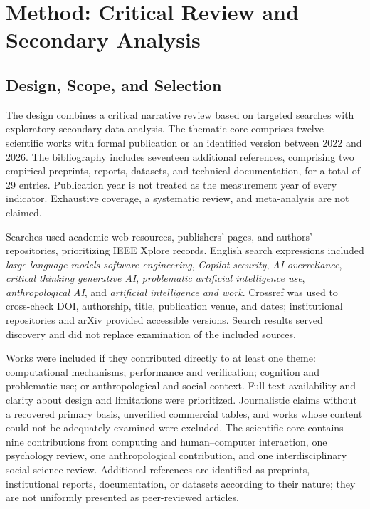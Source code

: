 \documentclass[11pt,a4paper]{article}
\begin{document}
\section{Method: Critical Review and Secondary Analysis}
\subsection{Design, Scope, and Selection}
The design combines a critical narrative review based on targeted searches with exploratory secondary data analysis. The thematic core comprises twelve scientific works with formal publication or an identified version between 2022 and 2026. The bibliography includes seventeen additional references, comprising two empirical preprints, reports, datasets, and technical documentation, for a total of 29 entries. Publication year is not treated as the measurement year of every indicator. Exhaustive coverage, a systematic review, and meta-analysis are not claimed.

Searches used academic web resources, publishers' pages, and authors' repositories, prioritizing IEEE Xplore records. English search expressions included \textit{large language models software engineering}, \textit{Copilot security}, \textit{AI overreliance}, \textit{critical thinking generative AI}, \textit{problematic artificial intelligence use}, \textit{anthropological AI}, and \textit{artificial intelligence and work}. Crossref was used to cross-check DOI, authorship, title, publication venue, and dates; institutional repositories and arXiv provided accessible versions. Search results served discovery and did not replace examination of the included sources.

Works were included if they contributed directly to at least one theme: computational mechanisms; performance and verification; cognition and problematic use; or anthropological and social context. Full-text availability and clarity about design and limitations were prioritized. Journalistic claims without a recovered primary basis, unverified commercial tables, and works whose content could not be adequately examined were excluded. The scientific core contains nine contributions from computing and human--computer interaction, one psychology review, one anthropological contribution, and one interdisciplinary social science review. Additional references are identified as preprints, institutional reports, documentation, or datasets according to their nature; they are not uniformly presented as peer-reviewed articles.
\end{document}
